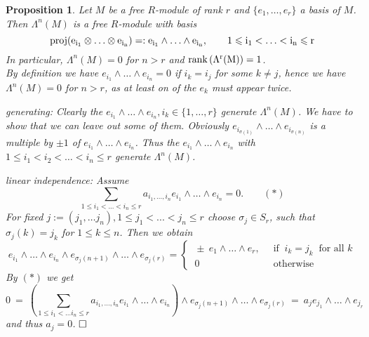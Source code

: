 \documentclass[11pt]{book}
\newtheorem{proposition}[theorem]{Proposition}
\theoremstyle{nonumberbreak}
\newenvironment{pr}[1][]{\ifthenelse{\equal{#1}{}}{\proof}{\proof[#1]}\rm}{\endproof}
\begin{document}
\begin{spacing}{1.3}
\begin{proposition} %
Let $M$ be a free $R$-module of rank $r$ and $\{e_1, \ldots, e_r\}$ a basis of $M$.
Then $\Lambda^n(M)$ is a free $R$-module with basis
$$ \rm{proj}(e_{i_1} \otimes \ldots \otimes e_{i_n}) =: e_{i_1}\wedge \ldots \wedge e_{i_n}, \qquad 1 \leqslant i_1 < \ldots < i_n \leqslant r$$
In particular, $\Lambda^n(M)=0$ for $n>r$ and $\rm{rank}\left(\Lambda^r(M)\right)=1$.\\
\begin{pr}
By definition we have $e_{i_1} \wedge \ldots \wedge e_{i_n}=0$ if $i_k =i_j$ for some $k \neq j$, hence we have $\Lambda^n(M)=0$ for $n > r$, as at least on of the $e_k$ must appear twice.
\begin{compactitem}
\item[\textit{generating:}] Clearly the $e_{i_1} \wedge \ldots \wedge e_{i_n}, i_k \in \{1, \ldots, r\}$ generate $\Lambda^n(M)$. We have to show that we can leave out some of them.
Obviously $e_{i_{\sigma(1)}} \wedge \ldots \wedge e_{i_{\sigma(n)}}$ is a multiple by $\pm 1 $ of $e_{i_1} \wedge \ldots \wedge e_{i_n}$.
Thus the $e_{i_1} \wedge \ldots \wedge e_{i_n}$ with $1 \leqslant i_1 < i_2 < \ldots < i_n \leqslant r$ generate $\Lambda^n(M)$. 
\item[\textit{linear independence:}] Assume
$$\sum_{1\leqslant i_1<...<i_n\leqslant r}a_{i_1, \ldots, i_n} e_{i_1} \wedge \ldots \wedge e_{i_n} = 0. \qquad (*)$$
For fixed $j:=(j_1, \ldots j_n), 1 \leqslant j_1 <...<j_n \leqslant r$ choose $\sigma_j \in S_r$, such that $\sigma_j(k)=j_k$ for $1 \leqslant k \leqslant n$.
Then we obtain 
$$e_{i_1} \wedge \ldots \wedge e_{i_n} \wedge e_{\sigma_j(n+1)} \wedge \ldots \wedge e_{\sigma_j(r)} = \begin{cases}\ \pm \ e_1 \wedge \ldots \wedge e_r, & \ \textrm{ if } \ i_k=j_k \ \textrm{ for all } k \\ \ 0 & \ \textrm{ otherwise } \end{cases}$$
By $(*)$ we get 
$$0\ = \ \left(\sum_{1 \leqslant i_1<\ldots i_n \leqslant r} a_{i_1,\ldots, i_n} e_{i_1} \wedge \ldots \wedge e_{i_n} \right) \wedge e_{\sigma_j(n+1)} \wedge \ldots \wedge e_{\sigma_j(r)} \ = \ a_j e_{j_1} \wedge \ldots \wedge e_{j_r}$$
and thus $a_j=0$. $\hfill \Box$
\end{compactitem}
\end{pr}
\end{proposition}


\end{spacing}
\end{document}
